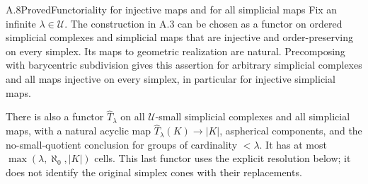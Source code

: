 \begin{claim}{A.8}{Proved}{Functoriality for injective maps and for all simplicial maps}
Fix an infinite $\lambda\in\mathcal U$. The construction in A.3 can be
chosen as a functor on ordered simplicial complexes and simplicial maps
that are injective and order-preserving on every simplex. Its maps to
geometric realization are natural. Precomposing with barycentric
subdivision gives this assertion for arbitrary simplicial complexes
and all maps injective on every simplex, in particular for injective
simplicial maps.

There is also a functor $\widehat T_\lambda$ on all
$\mathcal U$-small simplicial complexes and all simplicial maps, with a
natural acyclic map $\widehat T_\lambda(K)\to |K|$, aspherical
components, and the no-small-quotient conclusion for groups of
cardinality $<\lambda$. It has at most
$\max(\lambda,\aleph_0,|K|)$ cells. This last functor uses the explicit
resolution below; it does not identify the original simplex cones
with their replacements.
\end{claim}
